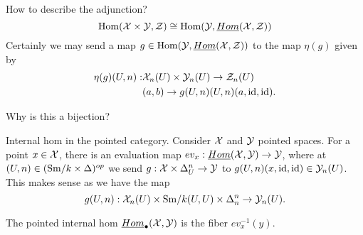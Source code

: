\documentclass{amsart}%
\begin{document}
\begin{enumerate}
\begin{definition}
  How to describe the adjunction? 
  \begin{equation*}
    \operatorname{Hom}(\mathcal{X} \times \mathcal{Y}, \mathcal{Z}) \cong \operatorname{Hom}(\mathcal{Y}, \underline{Hom}(\mathcal{X}, \mathcal{Z}))
  \end{equation*}
  Certainly we may send a map
  $g \in \operatorname{Hom}(\mathcal{Y}, \underline{Hom}(\mathcal{X}, \mathcal{Z}))$ to the map
  $\eta(g)$ given by 
  \begin{align*}
    \eta(g)(U,n) : &\mathcal{X}_n(U)\times \mathcal{Y}_n(U) \to \mathcal{Z}_n(U) \\ 
                   & (a,b) \to g(U,n)(U,n)(a,\operatorname{id},\operatorname{id}).
  \end{align*}

  Why is this a bijection? 
\end{definition}

\begin{definition}
  Internal hom in the pointed category. Consider $\mathcal{X}$ and $\mathcal{Y}$
  pointed spaces. For a point $x \in \mathcal{X}$, there is an evaluation
  map $ev_x : \underline{Hom}(\mathcal{X}, \mathcal{Y}) \to \mathcal{Y}$, where at
  $(U,n) \in (\mathrm{Sm}/k \times \Delta)^{op}$ we send
  $g : \mathcal{X} \times \Delta^n_U \to \mathcal{Y}$ to
  $g(U,n)(x, \operatorname{id}, \operatorname{id}) \in \mathcal{Y}_n(U)$. This makes sense as we have
  the map
  \begin{equation*}
    g(U,n) : \mathcal{X}_n(U) \times \mathrm{Sm}/k(U,U) \times \Delta^n_n \to \mathcal{Y}_n(U).
  \end{equation*}

  The pointed internal hom $\underline{Hom}_{\bullet}(\mathcal{X}, \mathcal{Y})$
  is the fiber $ev_{x}^{-1}(y)$. 
\end{definition}

\end{enumerate}
\end{document}
